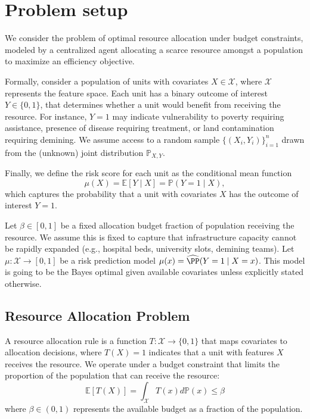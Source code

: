 \section{Problem setup}

We consider the problem of optimal resource allocation under budget constraints, modeled by a centralized agent allocating a scarce resource amongst a population to maximize an efficiency objective. 

Formally, consider a population of units with covariates $X \in \mathcal{X}$, where $\mathcal{X}$ represents the feature space. Each unit has a binary outcome of interest $Y \in \{0,1\}$, that determines whether a unit would benefit from receiving the resource. For instance, $Y=1$ may indicate vulnerability to poverty requiring assistance, presence of disease requiring treatment, or land contamination requiring demining. We assume access to a random sample $\{(X_i, Y_i)\}_{i=1}^n$ drawn from the (unknown) joint distribution $\mathbb{P}_{X,Y}$.

Finally, we define the risk score for each unit as the conditional mean function
\begin{equation}
  \mu(X) = \mathbb{E}[Y \mid X] = \mathbb{P}(Y=1 \mid X), 
\end{equation}
which captures the probability that a unit with covariates $X$ has the outcome of interest $Y=1$. 

Let $\beta \in [0,1]$ be a fixed allocation budget fraction of population receiving the resource. We assume this is fixed to capture that infrastructure capacity cannot be rapidly expanded (e.g., hospital beds, university slots, demining teams). Let $\mu: \mathcal{X} \to [0,1]$ be a risk prediction model $\mu(x) = \widehat{\PP}(Y=1 \mid X=x)$. This model is going to be the Bayes optimal given available covariates unless explicitly stated otherwise. 


\subsection{Resource Allocation Problem}


A resource allocation rule is a function $T: \mathcal{X} \to \{0,1\}$ that maps covariates to allocation decisions, where $T(X)=1$ indicates that a unit with features $X$ receives the resource. We operate under a budget constraint that limits the proportion of the population that can receive the resource:
\begin{equation}
    \mathbb{E}[T(X)] = \int_{\mathcal{X}} T(x) d\mathbb{P}(x) \leq \beta
\end{equation}
where $\beta \in (0,1)$ represents the available budget as a fraction of the population.


